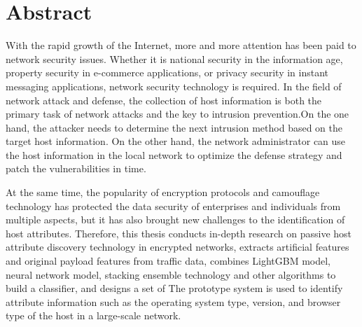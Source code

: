 \intobmk\chapter*{Abstract}%

With the rapid growth of the Internet, more and more attention has been paid to network security issues. Whether it is national security in the information age, property security in e-commerce applications, or privacy security in instant messaging applications, network security technology is required. In the field of network attack and defense, the collection of host information is both the primary task of network attacks and the key to intrusion prevention.On the one hand, the attacker needs to determine the next intrusion method based on the target host information. On the other hand, the network administrator can use the host information in the local network to optimize the defense strategy and patch the vulnerabilities in time.

At the same time, the popularity of encryption protocols and camouflage technology has protected the data security of enterprises and individuals from multiple aspects, but it has also brought new challenges to the identification of host attributes. Therefore, this thesis conducts in-depth research on passive host attribute discovery technology in encrypted networks, extracts artificial features and original payload features from traffic data, combines LightGBM model, neural network model, stacking ensemble technology and other algorithms to build a classifier, and designs a set of The prototype system is used to identify attribute information such as the operating system type, version, and browser type of the host in a large-scale network.

